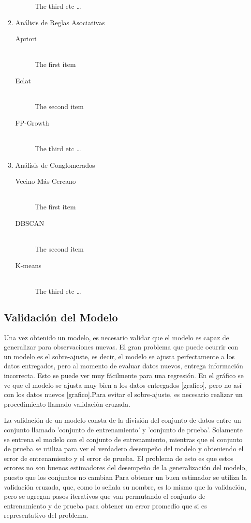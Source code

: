 \begin{enumerate}
\begin{description}
      The third etc \ldots     
    \end{description}
  \item Análisis de Reglas Asociativas
    \begin{description}
      \item[Apriori] \hfill \\
      The first item
      \item[Eclat] \hfill \\
      The second item
      \item[FP-Growth] \hfill \\
      The third etc \ldots
    \end{description}
  \item Análisis de Conglomerados
    \begin{description}
      \item[Vecino Más Cercano] \hfill \\
      The first item
      \item[DBSCAN] \hfill \\
      The second item
      \item[K-means] \hfill \\
      The third etc \ldots
    \end{description}
\end{enumerate}


\subsection{Validación del Modelo}

Una vez obtenido un modelo, es necesario validar que el modelo es capaz de generalizar para observaciones nuevas. El gran problema que puede ocurrir con un modelo es el sobre-ajuste, es decir, el modelo se ajusta perfectamente a los datos entregados, pero al momento de evaluar datos nuevos, entrega información incorrecta. Esto se puede ver muy fácilmente para una regresión. En el gráfico se ve que el modelo se ajusta muy bien a los datos entregados [grafico], pero no así con los datos nuevos [grafico].Para evitar el sobre-ajuste, es necesario realizar un procedimiento llamado validación cruzada.

La validación de un modelo consta de la división del conjunto de datos entre un conjunto llamado 'conjunto de entrenamiento' y 'conjunto de prueba'. Solamente se entrena el modelo con el conjunto de entrenamiento, mientras que el conjunto de prueba se utiliza para ver el verdadero desempeño del modelo y obteniendo el error de entrenamiento y el error de prueba. El problema de esto es que estos errores no son buenos estimadores del desempeño de la generalización del modelo, puesto que los conjuntos no cambian Para obtener un buen estimador se utiliza la validación cruzada, que, como lo señala su nombre, es lo mismo que la validación, pero se agregan pasos iterativos que van permutando el conjunto de entrenamiento y de prueba para obtener un error promedio que si es representativo del problema.

